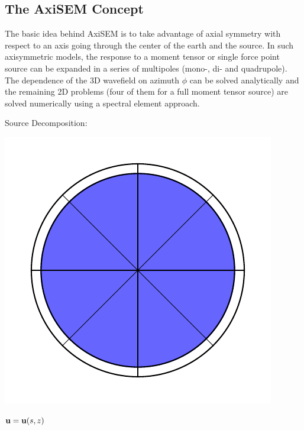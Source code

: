 \documentclass{article}
\renewcommand{\vec}[1]{\ensuremath{\mathbf{#1}}}
\begin{document}
\subsection{The AxiSEM Concept}
% 
The basic idea behind AxiSEM is to take advantage of axial symmetry with respect
to an axis going through the center of the earth and the source. In such axisymmetric
models, the response to a moment tensor or single force point source can be expanded in a
series of multipoles (mono-, di- and quadrupole). The dependence of the 3D wavefield on
azimuth $\phi$ can be solved analytically and the remaining 2D problems (four of them for
a full moment tensor source) are solved numerically using a spectral
element approach.
\begin{center}
    \begin{minipage}[t]{0.4\paperwidth}
        Source Decomposition:\\
        \begin{minipage}[c]{0.1\paperwidth}
            \includegraphics[width=\textwidth]{radpat_mono.pdf}%
        \end{minipage}%
        \begin{minipage}[c]{0.4\paperwidth}
            $\scriptsize{\vec u = \vec u (s,z)}$ \\
        \end{minipage}


\end{minipage}
\end{center}
\end{document}
